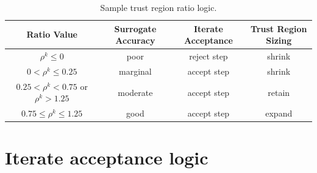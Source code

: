 \begin{table}
\centering
\caption{Sample trust region ratio logic.}
\label{tab:rho_k}
\begin{tabular}{cccc}
\hline
Ratio Value & Surrogate Accuracy & Iterate Acceptance & Trust Region Sizing \\
\hline
$\rho^k \le 0$ 
& poor
& reject step 
& shrink \\
$0 < \rho^k \le 0.25$
& marginal
& accept step
& shrink \\
$0.25 < \rho^k < 0.75$ or $\rho^k > 1.25$
& moderate
& accept step
& retain \\
$0.75 \le \rho^k \le 1.25$
& good
& accept step
& expand\footnotemark \\
\hline
\end{tabular}
\end{table}



\section{Iterate acceptance logic} \label{sbm:sblm_con_iter}

